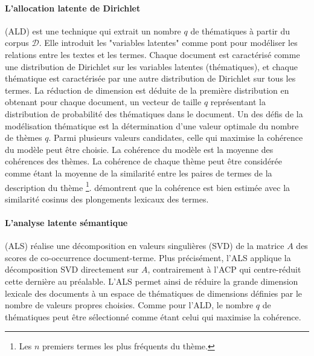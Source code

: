 \paragraph[LDA]{L'allocation latente de Dirichlet}
(ALD) \citep{blei2003lda} est une technique qui extrait un nombre $q$ de thématiques à partir du corpus $\mathcal{D}$. Elle introduit les "variables latentes" comme pont pour modéliser les relations entre les textes et les termes. Chaque document est caractérisé comme une distribution de Dirichlet sur les variables latentes (thématiques), et chaque thématique est caractérisée par une autre distribution de Dirichlet sur tous les termes. La réduction de dimension est déduite de la première distribution en obtenant pour chaque document, un vecteur de taille $q$ représentant la distribution de probabilité des thématiques dans le document. Un des défis de la modélisation thématique est la détermination d'une valeur optimale du nombre de thèmes $q$. Parmi plusieurs valeurs candidates, celle qui maximise la cohérence du modèle peut être choisie. La cohérence du modèle est la moyenne des  cohérences des thèmes. La cohérence de chaque thème peut être considérée comme étant la moyenne de la similarité entre les paires de termes de la description du thème \footnote{Les $n$ premiers termes les plus fréquents du thème.}. \citet{fang2016w2v_for_topiccoherence} démontrent que la cohérence est bien estimée avec la similarité cosinus des plongements lexicaux des termes.%

\paragraph[LSA]{L'analyse latente sémantique}
(ALS) \citep{dumais1988LSI, deerwester1990indexingbyLSA} réalise une décomposition en valeurs singulières (SVD) de la matrice $A$ des scores de co-occurrence document-terme. Plus précisément, l'ALS applique la décomposition SVD directement sur $A$, contrairement à l'ACP qui centre-réduit cette dernière au préalable. L'ALS permet ainsi de réduire la grande dimension lexicale des documents à un espace de thématiques de dimensions définies par le nombre de valeurs propres choisies. Comme pour l'ALD, le nombre $q$ de thématiques peut être sélectionné comme étant celui qui  maximise la cohérence. 


